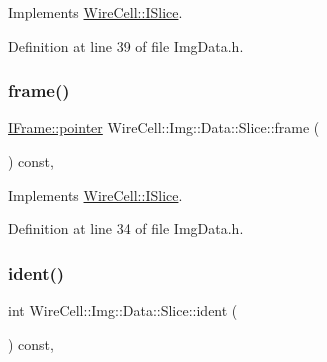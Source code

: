 Implements \hyperlink{class_wire_cell_1_1_i_slice_ab1bf2647aa2a184fc851d765612bd0a6}{Wire\+Cell\+::\+I\+Slice}.



Definition at line 39 of file Img\+Data.\+h.

\mbox{\label{class_wire_cell_1_1_img_1_1_data_1_1_slice_acff7cfb312929c31f3e457dfa96d37e6}} 
\subsubsection{\texorpdfstring{frame()}{frame()}}
{\footnotesize\ttfamily \hyperlink{class_wire_cell_1_1_i_data_aff870b3ae8333cf9265941eef62498bc}{I\+Frame\+::pointer} Wire\+Cell\+::\+Img\+::\+Data\+::\+Slice\+::frame (\begin{DoxyParamCaption}{ }\end{DoxyParamCaption}) const\hspace{0.3cm}{\ttfamily [inline]}, {\ttfamily [virtual]}}



Implements \hyperlink{class_wire_cell_1_1_i_slice_abc8484df4c8c4624b4a6e0819e5916e1}{Wire\+Cell\+::\+I\+Slice}.



Definition at line 34 of file Img\+Data.\+h.

\mbox{\label{class_wire_cell_1_1_img_1_1_data_1_1_slice_af4448bb9ab0b80b591763623ac23850a}} 
\subsubsection{\texorpdfstring{ident()}{ident()}}
{\footnotesize\ttfamily int Wire\+Cell\+::\+Img\+::\+Data\+::\+Slice\+::ident (\begin{DoxyParamCaption}{ }\end{DoxyParamCaption}) const\hspace{0.3cm}{\ttfamily [inline]}, {\ttfamily [virtual]}}



